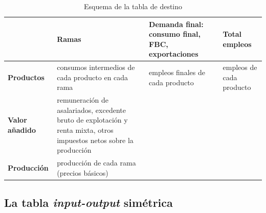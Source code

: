 \documentclass[11pt]{article}
\begin{document}
\begin{table}[H]
\centering
\caption{Esquema de la tabla de destino}\label{tab:destino}
\small
\begin{tabular}{>{\centering\arraybackslash}m{2.6cm}>{\centering\arraybackslash}m{4cm}>{\centering\arraybackslash}m{4cm}>{\centering\arraybackslash}m{2.2cm}}
\toprule
\rowcolor{tceeazulpalido} & \textbf{Ramas} & \textbf{Demanda final}: consumo final, FBC, exportaciones & \textbf{Total empleos}\\
\midrule
\textbf{Productos} & \cellcolor{tceesalvia}consumos intermedios de cada producto en cada rama & empleos finales de cada producto & empleos de cada producto\\
\addlinespace[0.3em]
\textbf{Valor añadido} & remuneración de asalariados, excedente bruto de explotación y renta mixta, otros impuestos netos sobre la producción & & \\
\addlinespace[0.3em]
\textbf{Producción} & producción de cada rama (precios básicos) & & \\
\bottomrule
\end{tabular}
\end{table}

\begin{infografia}[H]
\centering
\caption{Las tablas de origen y destino y sus identidades}\label{figu:origen-destino}
\end{infografia}

\subsection{La tabla \emph{input-output} simétrica}\label{sec:simetrica}
\end{document}
